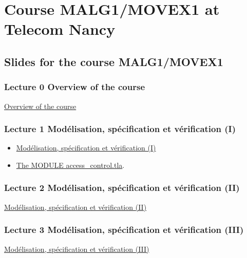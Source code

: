 \documentclass[ 12pt]{article}
\begin{document}
\section{Course MALG1/MOVEX1 at Telecom Nancy}
\label{sec:course-mcfsi-at}


\subsection{Slides for the course MALG1/MOVEX1}
\label{sec:slides}


\subsubsection{Lecture 0 {Overview of the course }}
  
  \href{http://mery54.github.io/teaching/movex/lecturesnotes/movexlecture0.pdf}{Overview of the course }


\subsubsection{Lecture 1 {Mod\'elisation, 
    sp\'ecification et v\'erification}  (I) }
  
\begin{itemize}
\item
  \href{http://mery54.github.io/teaching/movex/lecturesnotes/movexlecture1.pdf}{Mod\'elisation,
    sp\'ecification et v\'erification (I)}
\item
  \href{http://mery54.github.io/teaching/movex/tlafolder/access_control.tla}{The
    MODULE access\_control.tla}.  
 
\end{itemize}


  
\subsubsection{Lecture 2 {Mod\'elisation,      sp\'ecification et v\'erification} (II)}
  
  \href{http://mery54.github.io/teaching/movex/lecturesnotes/movexlecture2.pdf}{Mod\'elisation,     sp\'ecification et v\'erification (II)}


  \subsubsection{Lecture 3 {Mod\'elisation,      sp\'ecification et v\'erification} (III)}
  
  \href{http://mery54.github.io/teaching/movex/lecturesnotes/movexlecture3.pdf}{Mod\'elisation,     sp\'ecification et v\'erification (III)}
\end{document}
